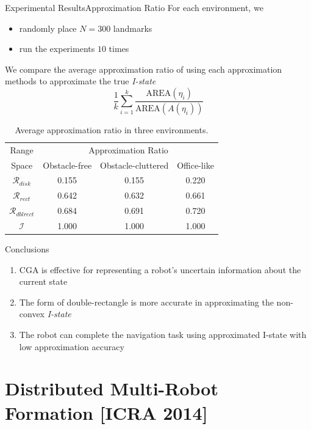 \documentclass[10pt]{beamer}
\begin{document}
\begin{frame}{Experimental Results}{Approximation Ratio}
  For each environment, we
  \begin{itemize}
  \item randomly place $N = 300$ landmarks 
  \item run the  experiments $10$ times
  \end{itemize} 
  \begin{block}{}
    \small{We compare the average approximation ratio of using each
      approximation methods to approximate the true \emph{I-state}}
    $$\frac{1}{k} \sum_{i=1}^k \frac{\text{AREA}(\eta_i)}{\text{AREA}(A(\eta_i))}$$
  \end{block}
\begin{table}
  \footnotesize\centering
    \begin{tabular}{cccc} 
    \hline
    Range  & \multicolumn{3}{c}{Approximation  Ratio}  \\
    Space  & Obstacle-free & Obstacle-cluttered & Office-like\\
    \hline
    $\mathcal{R}_{disk}$ & 0.155  & 0.155   & 0.220 \\ 
    \hline
    $\mathcal{R}_{rect}$  & 0.642   & 0.632  & 0.661 \\
    \hline
    $\mathcal{R}_{dblrect}$ & 0.684 & 0.691  & 0.720 \\
    \hline
    $\mathcal{I}$ & 1.000  & 1.000  & 1.000 \\
    \hline
    \end{tabular}
    \caption{\scriptsize{Average approximation ratio in three environments.}}
\end{table}

\end{frame}

\begin{frame}{Conclusions}
  \begin{enumerate}
  \item CGA is effective for representing a robot's uncertain information about
    the current state
  \item The form of double-rectangle is more accurate in approximating the non-convex
    \emph{I-state}
  \item The robot can complete the navigation task using approximated I-state with
    low approximation accuracy
  \end{enumerate}
\end{frame}

\section{Distributed Multi-Robot Formation [ICRA 2014]}
\end{document}
